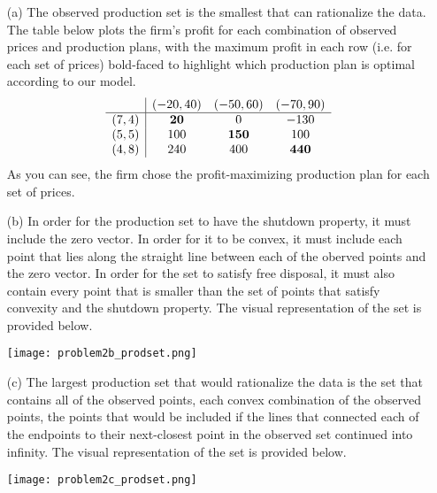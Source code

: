 \documentclass{article}
\begin{document}
\begin{itemize}
	\item[(a)] The observed production set is the smallest that can rationalize the data. The table below plots the firm's profit for each combination of observed prices and production plans, with the maximum profit in each row (i.e. for each set of prices) bold-faced to highlight which production plan is optimal according to our model.
		\[
			\begin{array}{ r|c c c }
						& (-20,40)			& (-50,60)		& (-70,90)		\\
				\hline
				(7,4)	& \textbf{20}		& 0				& -130			\\
				(5,5)	& 100				& \textbf{150}	& 100			\\
				(4,8)	& 240				& 400			& \textbf{440}
			\end{array}
		\]
		As you can see, the firm chose the profit-maximizing production plan for each set of prices.
	
	\item[(b)] In order for the production set to have the shutdown property, it must include the zero vector. In order for it to be convex, it must include each point that lies along the straight line between each of the oberved points and the zero vector. In order for the set to satisfy free disposal, it must also contain every point that is smaller than the set of points that satisfy convexity and the shutdown property. The visual representation of the set is provided below.
	
	\begin{center}
	\texttt{[image: problem2b\_prodset.png]}
	\end{center}
	
	\item[(c)] The largest production set that would rationalize the data is the set that contains all of the observed points, each convex combination of the observed points, the points that would be included if the lines that connected each of the endpoints to their next-closest point in the observed set continued into infinity. The visual representation of the set is provided below.
	
	\begin{center}
	\texttt{[image: problem2c\_prodset.png]}
	\end{center}
	
\end{itemize}



\end{document}
